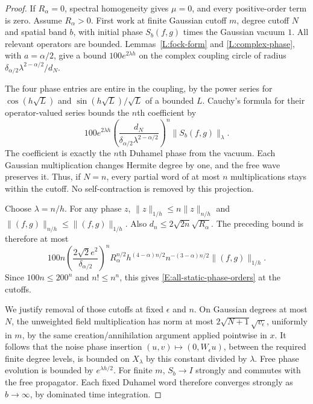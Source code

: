 \documentclass[12pt]{article}
\numberwithin{equation}{section}
\theoremstyle{definition}
\begin{document}
\begin{proof}
  If $R_\alpha=0$, spectral homogeneity gives $\mu=0$, and every
  positive-order term is zero. Assume $R_\alpha>0$.
  First work at finite Gaussian cutoff $m$, degree cutoff $N$ and
  spatial band $b$, with initial phase $S_b(f,g)$ times the Gaussian
  vacuum $1$. All relevant operators are bounded.
  Lemmas~\ref{L:fock-form} and \ref{L:complex-phase}, with $a=\alpha/2$,
  give a bound $100e^{2\lambda h}$ on the complex coupling circle
  of radius $\delta_{\alpha/2}\lambda^{2-\alpha/2}/d_N$.

  The four phase entries are entire in the coupling, by the power series
  for $\cos(h\sqrt L)$ and $\sin(h\sqrt L)/\sqrt L$ of a bounded $L$.
  Cauchy's formula for their operator-valued series bounds the $n$th
  coefficient by
  \[
    100e^{2\lambda h}
    \left(\frac{d_N}
    {\delta_{\alpha/2}\lambda^{2-\alpha/2}}\right)^n
    \|S_b(f,g)\|_\lambda .
  \]
  The coefficient is exactly the $n$th Duhamel phase from the vacuum.
  Each Gaussian multiplication changes Hermite degree by one,
  and the free wave preserves it. Thus, if $N=n$, every partial word
  of at most $n$ multiplications stays within the cutoff.
  No self-contraction is removed by this projection.

  Choose $\lambda=n/h$. For any phase $z$,
  $\|z\|_{1/h}\le n\|z\|_{n/h}$ and
  $\|(f,g)\|_{n/h}\le\|(f,g)\|_{1/h}$.
  Also $d_n\le2\sqrt{2n}\sqrt{R_\alpha}$.
  The preceding bound is therefore at most
  \[
    100n\left(\frac{2\sqrt2 e^2}{\delta_{\alpha/2}}\right)^n
    R_\alpha^{n/2}h^{(4-\alpha)n/2}
    n^{-(3-\alpha)n/2}\|(f,g)\|_{1/h}.
  \]
  Since $100n\le200^n$ and $n!\le n^n$, this gives
  \eqref{E:all-static-phase-orders} at the cutoffs.

  We justify removal of those cutoffs at fixed $\epsilon$ and $n$.
  On Gaussian degrees at most $N$, the unweighted field multiplication
  has norm at most $2\sqrt{N+1}\sqrt{v_\epsilon}$, uniformly in $m$,
  by the same creation/annihilation argument applied pointwise in $x$.
  It follows that the noise phase insertion
  $(u,v)\mapsto(0,W_\epsilon u)$, between the required finite degree
  levels, is bounded on $X_\lambda$ by this constant divided by
  $\lambda$. Free phase evolution is bounded by $e^{\lambda h/2}$.
  For finite $m$, $S_b\to I$ strongly and commutes with the free
  propagator. Each fixed Duhamel word therefore converges strongly
  as $b\to\infty$, by dominated time integration.


\end{proof}
\end{document}
